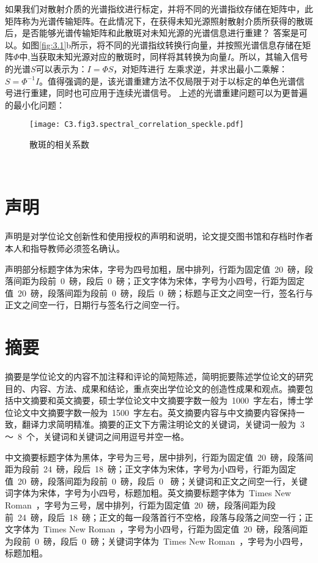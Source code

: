 如果我们对散射介质的光谱指纹进行标定，并将不同的光谱指纹存储在矩阵中，此矩阵称为光谱传输矩阵。在此情况下，在获得未知光源照射散射介质所获得的散斑后，是否能够光谱传输矩阵和此散斑对未知光源的光谱信息进行重建？
答案是可以。如图\ref{fig:3.1}b所示，将不同的光谱指纹转换行向量，并按照光谱信息存储在矩阵$\Phi$中,当获取未知光源对应的散斑时，同样将其转换为向量$I$。所以，其输入信号的光谱$S$可以表示为：$I={\Phi}S$，对矩阵进行
左乘求逆，并求出最小二乘解：$S={\Phi}^{-1}I$。值得强调的是，该光谱重建方法不仅局限于对于以标定的单色光谱信号进行重建，同时也可应用于连续光谱信号。
上述的光谱重建问题可以为更普遍的最小化问题：
~\\
\begin{figure}[htp]
	\centering
	\texttt{[image: C3.fig3.spectral\_correlation\_speckle.pdf]}
	\caption{散斑的相关系数}
	\label{fig:3.3}
\end{figure}
~\\

\section{声明}

声明是对学位论文创新性和使用授权的声明和说明，论文提交图书馆和存档时作者本人和指导教师必须签名确认。

声明部分标题字体为宋体，字号为四号加粗，居中排列，行距为固定值~20~磅，段落间距为段前~0~磅，段后~0~磅；正文字体为宋体，字号为小四号，行距为固定值~20~磅，段落间距为段前~0~磅，段后~0~磅；标题与正文之间空一行，签名行与正文之间空一行，日期行与签名行之间空一行。

\section{摘要}

摘要是学位论文的内容不加注释和评论的简短陈述，简明扼要陈述学位论文的研究目的、内容、方法、成果和结论，重点突出学位论文的创造性成果和观点。摘要包括中文摘要和英文摘要，硕士学位论文中文摘要字数一般为~1000~字左右，博士学位论文中文摘要字数一般为~1500~字左右。英文摘要内容与中文摘要内容保持一致，翻译力求简明精准。摘要的正文下方需注明论文的关键词，关键词一般为~3~ ～~8~个，关键词和关键词之间用逗号并空一格。

中文摘要标题字体为黑体，字号为三号，居中排列，行距为固定值~20~磅，段落间距为段前~24~磅，段后~18~磅；正文字体为宋体，字号为小四号，行距为固定值~20~磅，段落间距为段前~0~磅，段后~0~ 磅；关键词和正文之间空一行，关键词字体为宋体，字号为小四号，标题加粗。英文摘要标题字体为~Times New Roman~，字号为三号，居中排列，行距为固定值~20~磅，段落间距为段前~24~磅，段后~18~磅；正文的每一段落首行不空格，段落与段落之间空一行；正文字体为~Times New Roman~，字号为小四号，行距为固定值~20~磅，段落间距为段前~0~磅，段后~0~磅；关键词字体为~Times New Roman~，字号为小四号，标题加粗。

